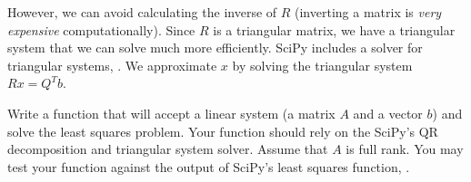 However, we can avoid calculating the inverse of $R$ (inverting a matrix is \emph{very expensive} computationally).
Since $R$ is a triangular matrix, we have a triangular system that we can solve much more efficiently.
SciPy includes a solver for triangular systems, .
We approximate $x$ by solving the triangular system $Rx = Q^T b$.

\begin{problem}
Write a function  that will accept a linear system (a matrix $A$ and a vector $b$) and solve the least squares problem.
Your function should rely on the SciPy's QR decomposition and triangular system solver.  Assume that $A$ is full rank.
You may test your function against the output of SciPy's least squares function, .
\end{problem}


